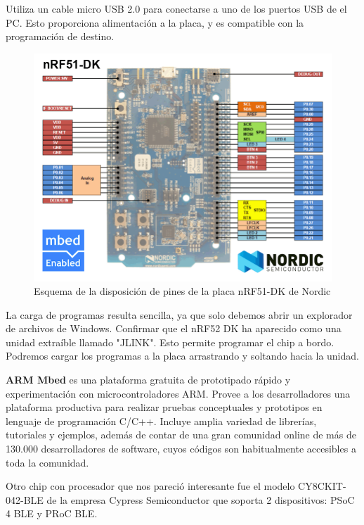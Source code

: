 Utiliza un cable micro USB 2.0 para conectarse a uno de los puertos USB de el PC. Esto proporciona alimentación a la placa, y es compatible con la programación de destino.

\begin{figure}[h]%
	\centering
    \includegraphics[scale=0.5]{figures/nRF51DK_pines.png} %

    \caption[Esquema de la disposición de pines de la placa nRF51-DK de Nordic]{Esquema de la disposición de pines de la placa nRF51-DK de Nordic}

   \label{figuraNordicNRF51}
\end{figure}

La  carga de programas resulta sencilla, ya que solo debemos abrir un explorador de archivos de Windows. Confirmar que el nRF52 DK ha aparecido como una unidad extraíble llamado "JLINK". Esto permite programar el chip a bordo. Podremos cargar los programas a la placa arrastrando y soltando hacia la unidad.

\textbf{ARM Mbed} es una plataforma gratuita de prototipado rápido y experimentación con microcontroladores ARM. Provee a los desarrolladores una plataforma productiva para realizar pruebas conceptuales y prototipos en lenguaje de programación C/C++. Incluye amplia variedad de librerías, tutoriales y ejemplos, además de contar de una gran comunidad online de más de 130.000 desarrolladores de software, cuyos códigos son habitualmente accesibles a toda la comunidad.

Otro chip con procesador que nos pareció interesante fue el modelo CY8CKIT-042-BLE de la empresa Cypress Semiconductor que soporta 2 dispositivos: PSoC 4 BLE y  PRoC BLE.


